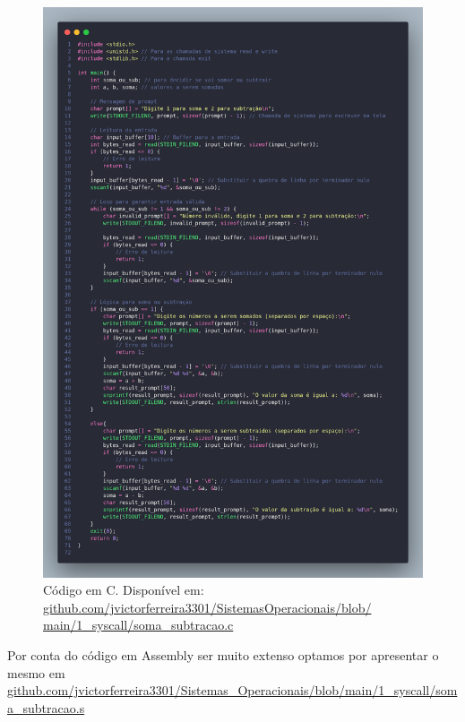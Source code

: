 \documentclass[
	12pt,				%
	openright,			%
	oneside,			%
	a4paper,			%
	chapter=TITLE,		%
	english,			%
	french,				%
	spanish,			%
	brazil				%
	]{abntex2}
\theoremstyle{definition}
\begin{document}
\begin{figure}
	\centering
	\begin{minipage}{1.0\textwidth}
	  \includegraphics[width=1.0\linewidth]{imagens/code_c.png}
	  \caption{Código em C. Disponível em: \href{https://github.com/jvictorferreira3301/Sistemas_Operacionais/blob/main/1_syscall/soma_subtracao.c}{github.com/jvictorferreira3301/SistemasOperacionais/blob/
	  main/1\_syscall/soma\_subtracao.c}}
	\end{minipage}
\end{figure}

Por conta do código em Assembly ser muito extenso optamos por apresentar o mesmo em \href{https://github.com/jvictorferreira3301/Sistemas_Operacionais/blob/main/1_syscall/soma_subtracao.s}
{github.com/jvictorferreira3301/Sistemas\_Operacionais/blob/main/1\_syscall/soma\_subtracao.s}
\end{document}
